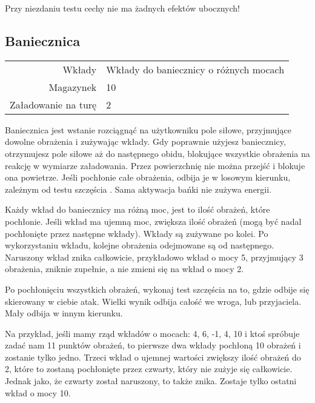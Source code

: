 Przy niezdaniu testu cechy nie ma żadnych efektów ubocznych!

\subsection{Baniecznica \abt{}}

\begin{tabular}{rl}
Wkłady & Wkłady do baniecznicy o różnych mocach \\
Magazynek & 10 \\
Załadowanie na turę & 2 \\
\end{tabular}

Baniecznica jest wstanie rozciągnąć na użytkowniku pole siłowe, przyjmujące dowolne obrażenia i zużywając wkłady.
Gdy poprawnie użyjesz baniecznicy, otrzymujesz pole siłowe aż do następnego obidu, blokujące wszystkie obrażenia na reakcję w wymiarze załadowania.
Przez powierzchnię nie można przejść i blokuje ona powietrze.
Jeśli pochłonie całe obrażenia, odbija je w losowym kierunku, zależnym od testu szczęścia \abh{}.
Sama aktywacja bańki nie zużywa energii.

Każdy wkład do baniecznicy ma różną moc, jest to ilość obrażeń, które pochłonie.
Jeśli wkład ma ujemną moc, zwiększa ilość obrażeń (mogą być nadal pochłonięte przez następne wkłady).
Wkłady są zużywane po kolei.
Po wykorzystaniu wkładu, kolejne obrażenia odejmowane są od następnego.
Naruszony wkład znika całkowicie, przykładowo wkład o mocy 5, przyjmujący 3 obrażenia, zniknie zupełnie, a nie zmieni się na wkład o mocy 2.

Po pochłonięciu wszystkich obrażeń, wykonaj test szczęścia \abh{} na to, gdzie odbije się skierowany w ciebie atak.
Wielki wynik odbija całość we wroga, lub przyjaciela. Mały odbija w innym kierunku.

Na przykład, jeśli mamy rząd wkładów o mocach: 4, 6, -1, 4, 10 i ktoś spróbuje zadać nam 11 punktów obrażeń, to pierwsze dwa wkłady pochłoną 10 obrażeń i zostanie tylko jedno.
Trzeci wkład o ujemnej wartości zwiększy ilość obrażeń do 2, które to zostaną pochłonięte przez czwarty, który nie zużyje się całkowicie.
Jednak jako, że czwarty został naruszony, to także znika. Zostaje tylko ostatni wkład o mocy 10.

